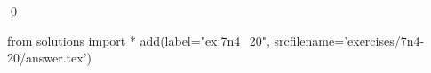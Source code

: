 \begin{ex}
  \label{ex:7n4_20}
  
  \mbox{}\\ \\
  \qed
\end{ex}
\begin{python0}
from solutions import *
add(label="ex:7n4_20",
    srcfilename='exercises/7n4-20/answer.tex') 
\end{python0}                              
